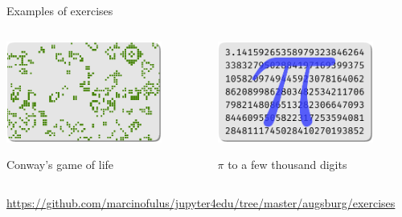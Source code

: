 \documentclass[svgnames]{beamer}
\begin{document}
\begin{frame}{Examples of exercises}
 \begin{columns}[t]
  \begin{column}{0.5\textwidth}
   \begin{center}
    \includegraphics[width=0.8\textwidth]{conway}

    Conway's game of life
   \end{center}
  \end{column}%
  \begin{column}{0.5\textwidth}
   \begin{center}
    \includegraphics[width=0.8\textwidth]{pi}

    $\pi$ to a few thousand digits
   \end{center}
  \end{column}%
 \end{columns}

 \vspace{0.4truecm}
 {\scriptsize\url{https://github.com/marcinofulus/jupyter4edu/tree/master/augsburg/exercises}}
\end{frame}
\end{document}
